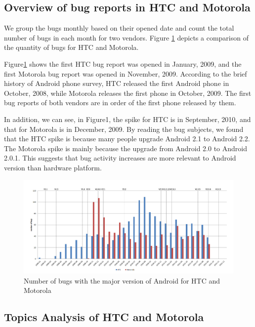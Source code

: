\documentclass[10pt, conference, compsocconf]{IEEEtran}
\begin{document}
\subsection{Overview of bug reports in HTC and Motorola}

We group the bugs monthly based on their opened date and count the total number of bugs in each month for two vendors. Figure \ref{bugovertime} depicts a comparison of the quantity of bugs for HTC and Motorola.

Figure\ref{bugovertime} shows the first HTC bug report was opened in January, 2009, and the first Motorola bug report was opened in November, 2009. According to the brief history of Android phone survey\cite{historyofandroid}, HTC released the first Android phone in October, 2008, while Motorola releases the first phone in October, 2009. The first bug reports of both vendors are in order of the first phone released by them. 

In addition, we can see, in Figure1, the spike for HTC is in September, 2010, and that for Motorola is in December, 2009. By reading the bug subjects, we found that the HTC spike is because many people upgrade Android 2.1 to Android 2.2. The Motorola spike is mainly because the upgrade from Android 2.0 to Android 2.0.1. This suggests that bug activity increases are more relevant to Android version than hardware platform.  

\begin{figure}[htb]
\centering
\includegraphics[width=1\textwidth]{bugovertime.png}
\caption{Number of bugs with the major version of Android for HTC and Motorola}
\label{bugovertime}
\end{figure}


\subsection{Topics Analysis of HTC and Motorola}
\end{document}
